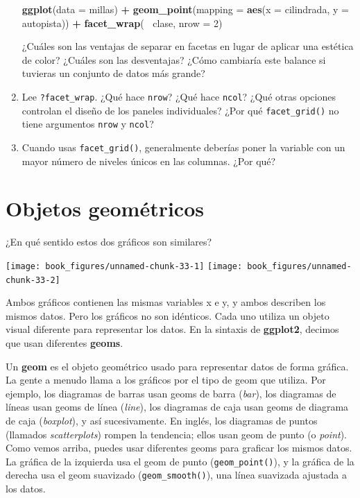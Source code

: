 \documentclass[11pt,oneside]{report}
\newenvironment{Shaded}{\begin{snugshade}}{\end{snugshade}}
\newcommand{\DataTypeTok}[1]{\textcolor[rgb]{0.13,0.29,0.53}{#1}}
\newcommand{\DecValTok}[1]{\textcolor[rgb]{0.00,0.00,0.81}{#1}}
\newcommand{\KeywordTok}[1]{\textcolor[rgb]{0.13,0.29,0.53}{\textbf{#1}}}
\newcommand{\NormalTok}[1]{#1}
\newcommand{\OperatorTok}[1]{\textcolor[rgb]{0.81,0.36,0.00}{\textbf{#1}}}
\newcommand{\StringTok}[1]{\textcolor[rgb]{0.31,0.60,0.02}{#1}}
\begin{document}
\begin{enumerate}
\begin{Shaded}
\begin{Highlighting}[]
\KeywordTok{ggplot}\NormalTok{(}\DataTypeTok{data =}\NormalTok{ millas) }\OperatorTok{+}
\StringTok{  }\KeywordTok{geom_point}\NormalTok{(}\DataTypeTok{mapping =} \KeywordTok{aes}\NormalTok{(}\DataTypeTok{x =}\NormalTok{ cilindrada, }\DataTypeTok{y =}\NormalTok{ autopista)) }\OperatorTok{+}
\StringTok{  }\KeywordTok{facet_wrap}\NormalTok{(}\OperatorTok{~}\StringTok{ }\NormalTok{clase, }\DataTypeTok{nrow =} \DecValTok{2}\NormalTok{)}
\end{Highlighting}
\end{Shaded}

  ¿Cuáles son las ventajas de separar en facetas en lugar de aplicar una
  estética de color? ¿Cuáles son las desventajas? ¿Cómo cambiaría este
  balance si tuvieras un conjunto de datos más grande?
\item
  Lee \texttt{?facet\_wrap}. ¿Qué hace \texttt{nrow}? ¿Qué hace
  \texttt{ncol}? ¿Qué otras opciones controlan el diseño de los paneles
  individuales? ¿Por qué \texttt{facet\_grid()} no tiene argumentos
  \texttt{nrow} y \texttt{ncol}?
\item
  Cuando usas \texttt{facet\_grid()}, generalmente deberías poner la
  variable con un mayor número de niveles únicos en las columnas. ¿Por
  qué?
\end{enumerate}

\hypertarget{objetos-geomuxe9tricos}{%
\section{Objetos geométricos}\label{objetos-geomuxe9tricos}}

¿En qué sentido estos dos gráficos son similares?

\texttt{[image: book\_figures/unnamed-chunk-33-1]}
\texttt{[image: book\_figures/unnamed-chunk-33-2]}

Ambos gráficos contienen las mismas variables x e y, y ambos describen
los mismos datos. Pero los gráficos no son idénticos. Cada uno utiliza
un objeto visual diferente para representar los datos. En la sintaxis de
\textbf{ggplot2}, decimos que usan diferentes \textbf{geoms}.

Un \textbf{geom} es el objeto geométrico usado para representar datos de
forma gráfica. La gente a menudo llama a los gráficos por el tipo de
geom que utiliza. Por ejemplo, los diagramas de barras usan geoms de
barra (\emph{bar}), los diagramas de líneas usan geoms de línea
(\emph{line}), los diagramas de caja usan geoms de diagrama de caja
(\emph{boxplot}), y así sucesivamente. En inglés, los diagramas de
puntos (llamados \emph{scatterplots}) rompen la tendencia; ellos usan
geom de punto (o \emph{point}). Como vemos arriba, puedes usar
diferentes geoms para graficar los mismos datos. La gráfica de la
izquierda usa el geom de punto (\texttt{geom\_point()}), y la gráfica de
la derecha usa el geom suavizado (\texttt{geom\_smooth()}), una línea
suavizada ajustada a los datos.
\end{document}

